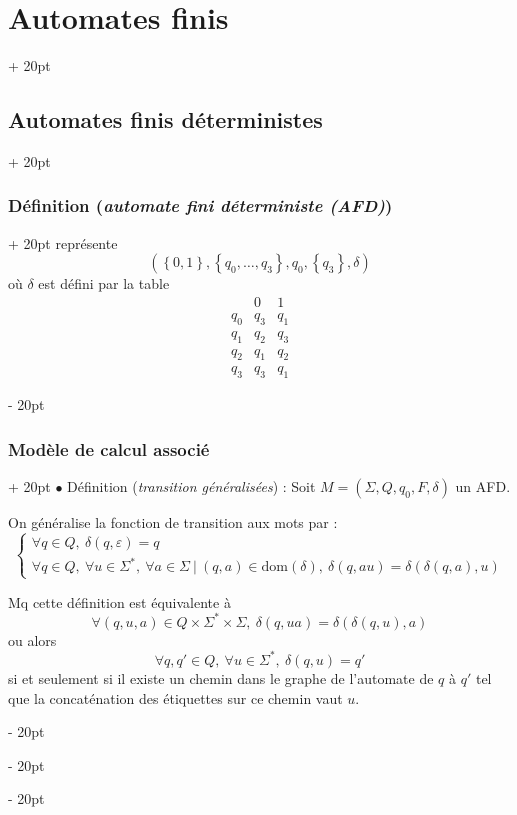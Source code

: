 \documentclass[a4paper, 12pt, twoside]{article}
\newcommand{\set}[1]{\left\{ #1 \right\}}
\newcommand{\ind}[1][20pt]{\advance\leftskip + #1}
\newcommand{\deind}[1][20pt]{\advance\leftskip - #1}
\newenvironment{indt}[2][20pt]{#2 \par \ind[#1]}{\par \deind} %
\begin{document}
\begin{indt}{\section{Automates finis}}
\begin{indt}{\subsection{Automates finis déterministes}}
\begin{indt}{\subsubsection{Définition (\textit{automate fini déterministe (AFD)})}}
                représente
                \[
                    (\set{0, 1}, \set{q_0, \ldots, q_3}, q_0, \set{q_3}, \delta)
                \]
                où $\delta$ est défini par la table
                \[
                    \begin{array}{c|c|c}
                        & 0 & 1
                        \\
                        \hline
                        q_0 & q_3 & q_1
                        \\
                        \hline
                        q_1 & q_2 & q_3
                        \\
                        \hline
                        q_2 & q_ 1 & q_2
                        \\
                        \hline
                        q_3 & q_3 & q_1
                    \end{array}
                \]
            \end{indt}

            \vspace{12pt}
            
            \begin{indt}{\subsubsection{Modèle de calcul associé}}
                $\bullet$ Définition (\emph{transition généralisées}) : Soit $M = (\Sigma, Q, q_0, F, \delta)$ un AFD.

                On généralise la fonction de transition aux mots par :
                \[
                    \begin{cases}
                        \forall q \in Q,\ \delta(q, \varepsilon) = q
                        \\
                        \forall q \in Q,\ \forall u \in \Sigma^*,\ \forall a \in \Sigma\ |\ (q, a) \in \mathrm{dom}(\delta),\ \delta(q, au) = \delta(\delta(q, a), u)
                    \end{cases}
                \]

                 Mq cette définition est équivalente à
                \[
                    \forall (q, u, a) \in Q \times \Sigma^* \times \Sigma,\
                    \delta(q, ua) = \delta(\delta(q, u), a)
                \]
                ou alors
                \[
                    \forall q, q' \in Q,\ \forall u \in \Sigma ^*,\ \delta(q, u) = q'
                \]
                si et seulement si il existe un chemin dans le graphe de l'automate de $q$ à $q'$ tel que la concaténation des étiquettes sur ce chemin vaut $u$.


\end{indt}
\end{indt}
\end{indt}
\end{document}
